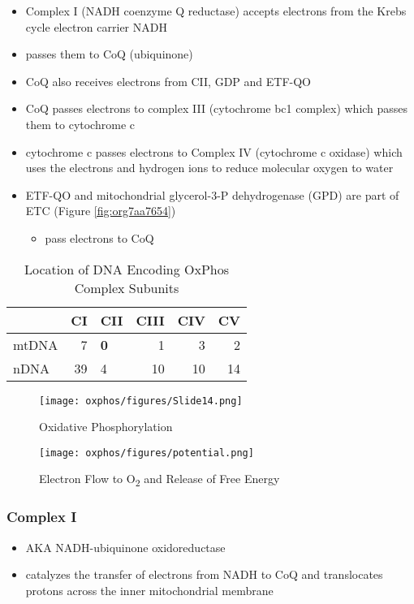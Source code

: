 \documentclass[12pt]{scrartcl}
\begin{document}
\begin{itemize}
\item Complex I (NADH coenzyme Q reductase) accepts electrons from the
Krebs cycle electron carrier NADH
\item passes them to CoQ (ubiquinone)
\item CoQ also receives electrons from CII, GDP and ETF-QO

\item CoQ passes electrons to complex III (cytochrome bc1 complex) which
passes them to cytochrome c
\item cytochrome c passes electrons to Complex IV (cytochrome c oxidase)
which uses the electrons and hydrogen ions to reduce molecular
oxygen to water

\item ETF-QO and mitochondrial glycerol-3-P dehydrogenase (GPD) are part of ETC (Figure \ref{fig:org7aa7654})
\begin{itemize}
\item pass electrons to CoQ
\end{itemize}
\end{itemize}

\begin{table}[htbp]
\caption{\label{tab:orgd3e3cc6}Location of DNA Encoding OxPhos Complex Subunits}
\centering
\begin{tabular}{lrlrrr}
 & CI & CII & CIII & CIV & CV\\
\hline
mtDNA & 7 & \textbf{0} & 1 & 3 & 2\\
nDNA & 39 & 4 & 10 & 10 & 14\\
\end{tabular}
\end{table}

\begin{figure}[htbp]
\centering
\texttt{[image: oxphos/figures/Slide14.png]}
\caption[ETC]{\label{fig:org41e64bd}Oxidative Phosphorylation}
\end{figure}

\begin{figure}[htbp]
\centering
\texttt{[image: oxphos/figures/potential.png]}
\caption[redox]{\label{fig:orgd74c8fb}Electron Flow to O\textsubscript{2} and Release of Free Energy}
\end{figure}

\subsubsection{Complex I}
\label{sec:org1c17a00}
\begin{itemize}
\item AKA NADH-ubiquinone oxidoreductase
\item catalyzes the transfer of electrons from NADH to CoQ and
translocates protons across the inner mitochondrial membrane
\end{itemize}
\end{document}
